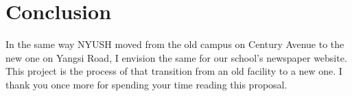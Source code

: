 \section{Conclusion}
In the same way NYUSH moved from the old campus on Century Avenue to the new one on Yangsi Road, I envision the same for our school's newspaper website. This project is the process of that transition from an old facility to a new one. I thank you once more for spending your time reading this proposal.
